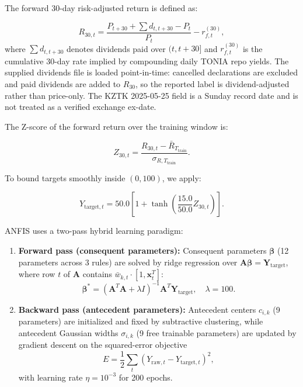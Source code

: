 \documentclass[pdflatex,sn-mathphys-num]{sn-jnl}
\theoremstyle{thmstyleone}
\theoremstyle{thmstyletwo}
\theoremstyle{thmstylethree}
\begin{document}
The forward 30-day risk-adjusted return is defined as:

\begin{equation}
    R_{30,t} = \frac{P_{t+30} + \sum d_{t,t+30} - P_t}{P_t} - r^{(30)}_{f,t},
    \label{eq:fwd_return}
\end{equation}
where $\sum d_{t,t+30}$ denotes dividends paid over $(t, t+30]$ and $r^{(30)}_{f,t}$ is the cumulative 30-day rate implied by compounding daily TONIA repo yields. The supplied dividends file is loaded point-in-time: cancelled declarations are excluded and paid dividends are added to $R_{30}$, so the reported label is dividend-adjusted rather than price-only. The KZTK 2025-05-25 field is a Sunday record date and is not treated as a verified exchange ex-date.

The Z-score of the forward return over the training window is:

\begin{equation}
    Z_{30,t} = \frac{R_{30,t} - \bar{R}_{T_{\mathrm{train}}}}{\sigma_{R, T_{\mathrm{train}}}}.
    \label{eq:zscore}
\end{equation}

To bound targets smoothly inside $(0,100)$, we apply:

\begin{equation}
    Y_{\mathrm{target},t} = 50.0 \left[ 1 + \tanh\left( \frac{15.0}{50.0} Z_{30,t} \right) \right].
    \label{eq:bounded_target}
\end{equation}

ANFIS uses a two-pass hybrid learning paradigm:
\begin{enumerate}
    \item \textbf{Forward pass (consequent parameters):} Consequent parameters $\boldsymbol{\beta}$ (12 parameters across 3 rules) are solved by ridge regression over $\mathbf{A}\boldsymbol{\beta} = \mathbf{Y}_{\mathrm{target}}$, where row $t$ of $\mathbf{A}$ contains $\bar{w}_{k,t} \cdot [1, \mathbf{x}_t^T]$:
    \begin{equation}
        \boldsymbol{\beta}^* = (\mathbf{A}^T \mathbf{A}+\lambda I)^{-1} \mathbf{A}^T \mathbf{Y}_{\mathrm{target}},\quad \lambda=100.
        \label{eq:ls}
    \end{equation}
    \item \textbf{Backward pass (antecedent parameters):} Antecedent centers $c_{i,k}$ (9 parameters) are initialized and fixed by subtractive clustering, while antecedent Gaussian widths $\sigma_{i,k}$ (9 free trainable parameters) are updated by gradient descent on the squared-error objective
    \begin{equation}
        E = \frac{1}{2}\sum_{t} \left( Y_{\mathrm{raw},t} - Y_{\mathrm{target},t} \right)^2,
        \label{eq:train_error}
    \end{equation}
    with learning rate $\eta = 10^{-3}$ for 200 epochs.
\end{enumerate}
\end{document}
